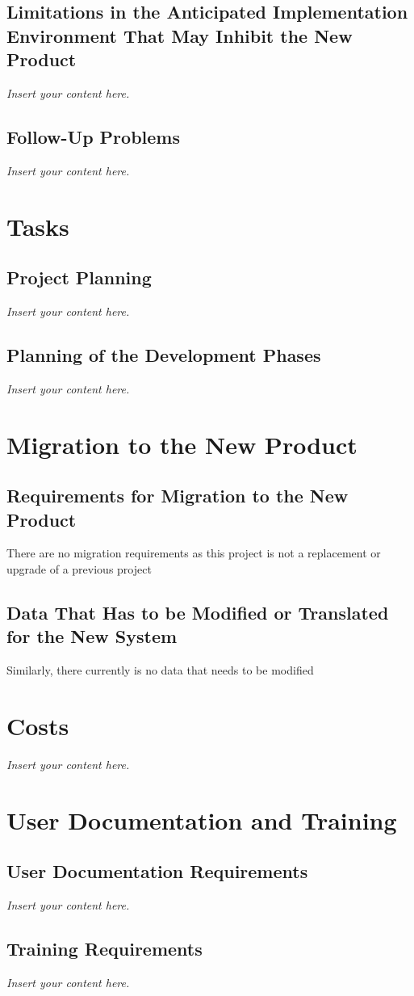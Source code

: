 \documentclass[12pt]{article}
\newcommand{\lips}{\textit{Insert your content here.}}
\begin{document}
\subsection{Limitations in the Anticipated Implementation Environment That May
Inhibit the New Product}
\lips
\subsection{Follow-Up Problems}
\lips

\section{Tasks}
\subsection{Project Planning}
\lips
\subsection{Planning of the Development Phases}
\lips

\section{Migration to the New Product}
\subsection{Requirements for Migration to the New Product}
There are no migration requirements as this project is not a replacement or upgrade of a previous project
\subsection{Data That Has to be Modified or Translated for the New System}
Similarly, there currently is no data that needs to be modified

\section{Costs}
\lips
\section{User Documentation and Training}
\subsection{User Documentation Requirements}
\lips
\subsection{Training Requirements}
\lips
\end{document}
